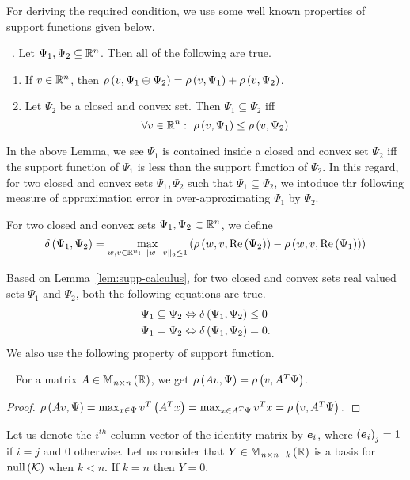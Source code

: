 For deriving the required condition, we use some well known properties
of support functions given below.
%
\begin{lemma}~\label{lem:supp-calculus}.  Let $\Psi_1,\Psi_2\subseteq\mathbb{R}^n$.  Then all of the following are true.
%
\begin{enumerate}
\item If $v\in\mathbb{R}^n$, then $\rho\left(v,\Psi_1\oplus\Psi_2\right)=\rho\left(v,\Psi_1\right)+\rho\left(v,\Psi_2\right)$.
\item Let $\Psi_2$ be a closed and convex set.  Then
$\Psi_1\subseteq\Psi_2$ iff
%
\[
\forall v\in\mathbb{R}^n:~\rho\left(v,\Psi_1\right)\leq\rho\left(v,\Psi_2\right)
\]
%
\end{enumerate}
%
\end{lemma}
%
In the above Lemma, we see $\Psi_1$ is contained inside a closed and
convex set $\Psi_2$ iff the support function of $\Psi_1$ is less than
the support function of $\Psi_2$.  In this regard, for two closed and
convex sets $\Psi_1,\Psi_2$ such that $\Psi_1\subseteq\Psi_2$, we
intoduce thr following measure of approximation error in
over-approximating $\Psi_1$ by $\Psi_2$.
%
\begin{definition}
For two closed and convex sets $\Psi_1,\Psi_2\subset\mathbb{R}^n$, we
define
\[
\delta\left(\Psi_1,\Psi_2\right)=\max_{w,v\in\mathbb{R}^n:~\left\|w-v\right\|_2\leq
  1}\left(\rho\left(w,v,\operatorname{Re}\left(\Psi_2\right)\right)-\rho\left(w,v,\operatorname{Re}\left(\Psi_1\right)\right)\right)
\]
%
\end{definition}
%
Based on Lemma~\ref{lem:supp-calculus}, for two closed and convex sets
real valued sets
$\Psi_1$ and $\Psi_2$, both the following equations are true.
%
\begin{align*}
& \Psi_1\subseteq\Psi_2 \Leftrightarrow \delta\left(\Psi_1,\Psi_2\right)\leq 0\\
& \Psi_1=\Psi_2 \Leftrightarrow \delta\left(\Psi_1,\Psi_2\right)=0.
\end{align*}
%
We also use the following property of support function.
%
\begin{lemma}~\label{lem:supp-mult-matrix}
For a matrix $A\in\mathbb{M}_{n\times n}\left(\mathbb{R}\right)$, we get $\rho\left(Av,\Psi\right)=\rho\left(v,A^T\Psi\right)$.
\end{lemma}
%
\begin{proof}
$\rho\left(Av,\Psi\right)=\max_{x\in\Psi}v^T\left(A^Tx\right)=\max_{x\in
A^T\Psi}v^Tx=\rho\left(v,A^T\Psi\right).$
\end{proof}
%
Let us denote the $i^{th}$ column vector of the identity matrix by
$\bm{e}_{i}$, where $\left(\bm{e}_{i}\right)_j=1$ if $i=j$ and $0$ otherwise.
Let us consider that $Y\in\mathbb{M}_{n\times n-k}\left(\mathbb{R}\right)$ is a basis for
$\operatorname{null}\left(\mathcal{K}\right)$ when $k<n$.  If $k=n$ then $Y=0$.

